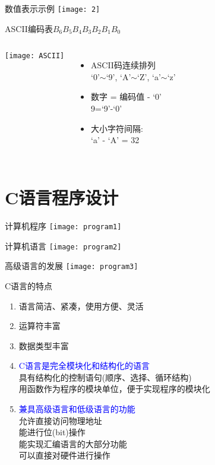 \begin{frame}{数值表示示例}
\texttt{[image: 2]}
\end{frame}

\begin{frame}{ASCII编码表$B_6B_5B_4B_3B_2B_1B_0$}
\begin{columns}
	\texttt{[image: ASCII]}
	\begin{itemize}
		\item ASCII码连续排列 \\
		 `0'$\sim$`9', `A'$\sim$`Z', `a'$\sim$`z'
		\item 数字 = 编码值 - `0' \\
		 9=`9'-`0'
		\item 大小字符间隔: \\
		`a' - `A' = 32
	\end{itemize}	
\end{columns}
\end{frame}

\section{C语言程序设计}

\begin{frame}{计算机程序}
\texttt{[image: program1]}
\end{frame}

\begin{frame}{计算机语言}
\texttt{[image: program2]}
\end{frame}

\begin{frame}{高级语言的发展}
\texttt{[image: program3]}
\end{frame}

\begin{frame}{C语言的特点}
\begin{enumerate}
	\item 语言简洁、紧凑，使用方便、灵活
    \item 运算符丰富
    \item 数据类型丰富
    \item \textcolor{blue}{C语言是完全模块化和结构化的语言}\\
          具有结构化的控制语句(顺序、选择、循环结构)\\
          用函数作为程序的模块单位，便于实现程序的模块化
    \item \textcolor{blue}{兼具高级语言和低级语言的功能}\\
          允许直接访问物理地址\\
          能进行位(bit)操作\\  
          能实现汇编语言的大部分功能\\
          可以直接对硬件进行操作        
\end{enumerate}
\end{frame}

